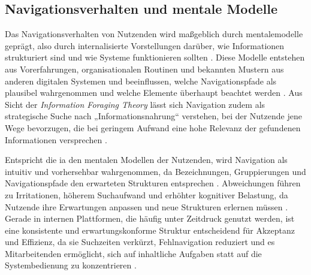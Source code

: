 \subsection{Navigationsverhalten und mentale Modelle}
\label{subsec:02-03-01_navigation-and-mental-models}

Das Navigationsverhalten von Nutzenden wird maßgeblich durch \gls{mentalemodelle} geprägt, also durch internalisierte Vorstellungen darüber, wie Informationen strukturiert sind und wie Systeme funktionieren sollten \cite{905:Norman1983,414:Johnson2021}. Diese Modelle entstehen aus Vorerfahrungen, organisationalen Routinen und bekannten Mustern aus anderen digitalen Systemen und beeinflussen, welche Navigationspfade als plausibel wahrgenommen und welche Elemente überhaupt beachtet werden \cite{414:Johnson2021,201:ArangoIA}. Aus Sicht der \textit{Information Foraging Theory} lässt sich Navigation zudem als strategische Suche nach „Informationsnahrung“ verstehen, bei der Nutzende jene Wege bevorzugen, die bei geringem Aufwand eine hohe Relevanz der gefundenen Informationen versprechen \cite{416:PirolliCard1999}.

Entspricht die \Gls{ia} den mentalen Modellen der Nutzenden, wird Navigation als intuitiv und vorhersehbar wahrgenommen, da Bezeichnungen, Gruppierungen und Navigationspfade den erwarteten Strukturen entsprechen \cite{303:Rosenfeld2015,414:Johnson2021}. Abweichungen führen zu Irritationen, höherem Suchaufwand und erhöhter kognitiver Belastung, da Nutzende ihre Erwartungen anpassen und neue Strukturen erlernen müssen \cite{414:Johnson2021,105:Sweller1988}. Gerade in internen Plattformen, die häufig unter Zeitdruck genutzt werden, ist eine konsistente und erwartungskonforme Struktur entscheidend für Akzeptanz und Effizienz, da sie Suchzeiten verkürzt, Fehlnavigation reduziert und es Mitarbeitenden ermöglicht, sich auf inhaltliche Aufgaben statt auf die Systembedienung zu konzentrieren \cite{300:FraunhoferIESE2018,303:Rosenfeld2015}.
